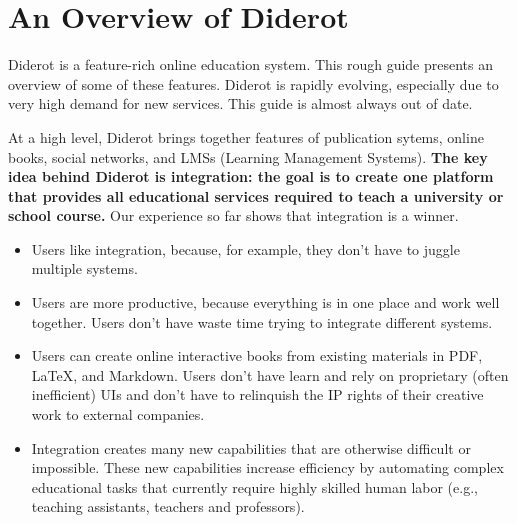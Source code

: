 \chapter{An Overview of Diderot}
\label{ch:overview}

\begin{gram}
\label{ch:overview::intro}
Diderot is a feature-rich online education system. This rough guide
presents an overview of some of these features.  Diderot is rapidly evolving,
especially due to very high demand for new services. This guide is
almost always out of date.
\end{gram}

\begin{gram}
\label{ch:overview::features}
At a high level, Diderot brings together features of publication
sytems, online books, social networks, and LMSs (Learning Management
Systems).
%
\textbf{The key idea behind Diderot is integration: the goal is to
  create one platform that provides all educational services required
  to teach a university or school course.}
%
Our experience so far shows that integration is a winner.
\begin{itemize}
\item Users like integration, because, for example, they don't have to juggle multiple systems.

\item Users are more productive, because everything is in one place
  and work well together. Users don't have waste time trying to
  integrate different systems.

\item Users can create online interactive books from existing
  materials in PDF, LaTeX, and Markdown.  Users don't have learn and
  rely on proprietary (often inefficient) UIs and don't have to
  relinquish the IP rights of their creative work to external
  companies.
  
\item Integration creates many new capabilities that are otherwise
  difficult or impossible.  These new capabilities increase efficiency
  by automating complex educational tasks that currently require
  highly skilled human labor (e.g., teaching assistants, teachers and
  professors).
  
\end{itemize}
%

\end{gram}

